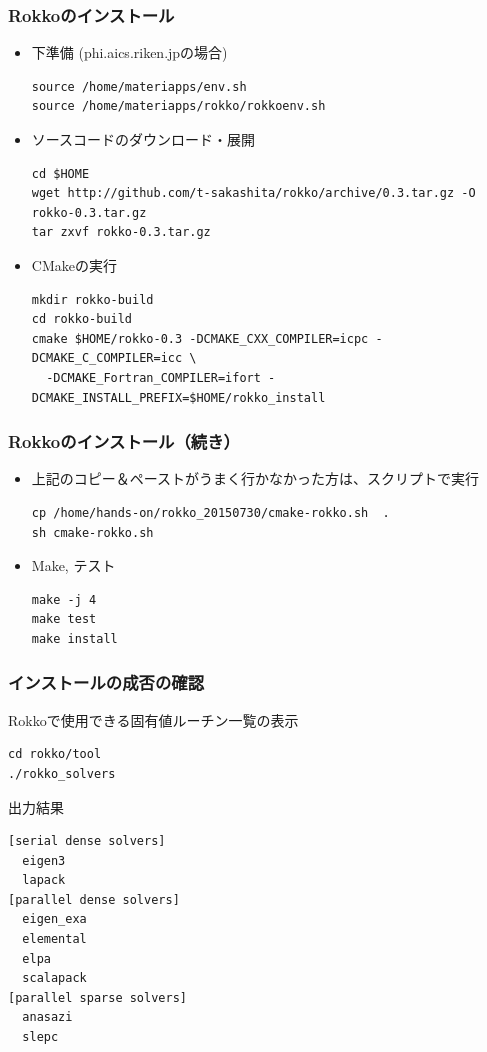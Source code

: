 \begin{frame}[c,fragile]
  \frametitle{Rokkoのインストール}
  \begin{itemize}
  \item 下準備 (phi.aics.riken.jpの場合)
\begin{lstlisting}[style=shstyle]
source /home/materiapps/env.sh
source /home/materiapps/rokko/rokkoenv.sh
\end{lstlisting}
  \item ソースコードのダウンロード・展開
\begin{lstlisting}[style=shstyle]
cd $HOME
wget http://github.com/t-sakashita/rokko/archive/0.3.tar.gz -O rokko-0.3.tar.gz
tar zxvf rokko-0.3.tar.gz
\end{lstlisting}
  \item CMakeの実行
\begin{lstlisting}[style=shstyle]
mkdir rokko-build
cd rokko-build
cmake $HOME/rokko-0.3 -DCMAKE_CXX_COMPILER=icpc -DCMAKE_C_COMPILER=icc \
  -DCMAKE_Fortran_COMPILER=ifort -DCMAKE_INSTALL_PREFIX=$HOME/rokko_install
\end{lstlisting}
  \end{itemize}
\end{frame}

\begin{frame}[c,fragile]
  \frametitle{Rokkoのインストール（続き）}
  \begin{itemize}
  \item 上記のコピー＆ペーストがうまく行かなかった方は、スクリプトで実行
\begin{lstlisting}[style=shstyle]
cp /home/hands-on/rokko_20150730/cmake-rokko.sh  .
sh cmake-rokko.sh
\end{lstlisting}
  \item Make, テスト
\begin{lstlisting}[style=shstyle]
make -j 4
make test
make install
\end{lstlisting}
  \end{itemize}
\end{frame}

\begin{frame}[c,fragile]
  \frametitle{インストールの成否の確認}
Rokkoで使用できる固有値ルーチン一覧の表示 
\begin{lstlisting}[style=shstyle]
cd rokko/tool
./rokko_solvers
\end{lstlisting}

出力結果
\begin{lstlisting}[style=shstyle]
[serial dense solvers]
  eigen3
  lapack
[parallel dense solvers]
  eigen_exa
  elemental
  elpa
  scalapack
[parallel sparse solvers]
  anasazi
  slepc
\end{lstlisting}

\end{frame}

